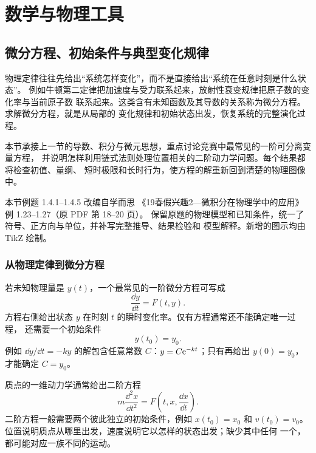\documentclass[UTF8,zihao=-4,oneside,openany]{ctexbook}
\begin{document}
\setcounter{page}{1}
\setcounter{chapter}{0}
\chapter{数学与物理工具}
\setcounter{section}{3}
\fi
\ifdefined\MASTERBOOK\clearpage\fi
\section{微分方程、初始条件与典型变化规律}

物理定律往往先给出“系统怎样变化”，而不是直接给出“系统在任意时刻是什么状态”。
例如牛顿第二定律把加速度与受力联系起来，放射性衰变规律把原子数的变化率与当前原子数
联系起来。这类含有未知函数及其导数的关系称为微分方程。求解微分方程，就是从局部的
变化规律和初始状态出发，恢复系统的完整演化过程。

本节承接上一节的导数、积分与微元思想，重点讨论竞赛中最常见的一阶可分离变量方程，
并说明怎样利用链式法则处理位置相关的二阶动力学问题。每个结果都将检查初值、量纲、
短时极限和长时行为，使方程的解重新回到清楚的物理图像中。

\begin{sourcebox}
本节例题 1.4.1--1.4.5 改编自学而思
《19春假兴趣2—微积分在物理学中的应用》例 1.23--1.27（原 PDF 第 18--20 页）。
保留原题的物理模型和已知条件，统一了符号、正方向与单位，并补写完整推导、结果检验和
模型解释。新增的图示均由 TikZ 绘制。
\end{sourcebox}

\subsection{从物理定律到微分方程}

若未知物理量是 $y(t)$，一个最常见的一阶微分方程可写成
\begin{equation}
  \frac{\dd y}{\dd t}=F(t,y).
  \label{eq:first-order-ode}
\end{equation}
方程右侧给出状态 $y$ 在时刻 $t$ 的瞬时变化率。仅有方程通常还不能确定唯一过程，
还需要一个初始条件
\begin{equation}
  y(t_0)=y_0.
  \label{eq:first-order-initial-condition}
\end{equation}
例如 $\dd y/\dd t=-ky$ 的解包含任意常数 $C$：$y=C\mathrm e^{-kt}$；只有再给出
$y(0)=y_0$，才能确定 $C=y_0$。

质点的一维动力学通常给出二阶方程
\begin{equation}
  m\frac{\dd^2x}{\dd t^2}=F\!\left(t,x,\frac{\dd x}{\dd t}\right).
  \label{eq:second-order-dynamics}
\end{equation}
二阶方程一般需要两个彼此独立的初始条件，例如 $x(t_0)=x_0$ 和
$v(t_0)=v_0$。位置说明质点从哪里出发，速度说明它以怎样的状态出发；缺少其中任何
一个，都可能对应一族不同的运动。
\end{document}
